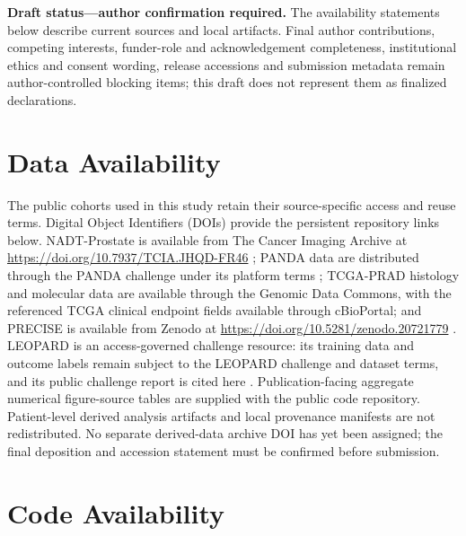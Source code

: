 \noindent\textbf{Draft status---author confirmation required.}
The availability statements below describe current sources and local artifacts. Final
author contributions, competing interests, funder-role and acknowledgement completeness,
institutional ethics and consent wording, release accessions and submission metadata remain
author-controlled blocking items; this draft does not represent them as finalized declarations.

\section*{Data Availability}

The public cohorts used in this study retain their source-specific access and reuse terms.
Digital Object Identifiers (DOIs) provide the persistent repository links below.
NADT-Prostate is available from The Cancer Imaging Archive at
\url{https://doi.org/10.7937/TCIA.JHQD-FR46} \cite{nadt2021}; PANDA data are distributed through the
PANDA challenge under its platform terms \cite{panda2022}; TCGA-PRAD histology and
molecular data are available through the Genomic Data Commons, with the referenced
TCGA clinical endpoint fields available through cBioPortal; and PRECISE is available from
Zenodo at \url{https://doi.org/10.5281/zenodo.20721779} \cite{precise2026}. LEOPARD is an
access-governed challenge resource: its training data and outcome labels remain subject to
the LEOPARD challenge and dataset terms, and its public challenge report is cited here
\cite{leopard2026}. Publication-facing aggregate numerical figure-source tables are supplied
with the public code repository. Patient-level derived analysis artifacts and local provenance
manifests are not redistributed. No separate derived-data archive DOI has yet been assigned;
the final deposition and accession statement must be confirmed before submission.

\section*{Code Availability}


